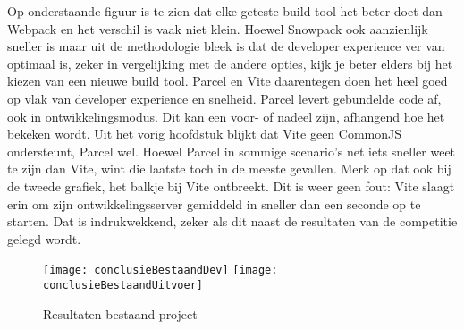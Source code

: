 Op onderstaande figuur is te zien dat elke geteste build tool het beter doet dan Webpack en het verschil is vaak niet klein. Hoewel Snowpack ook aanzienlijk sneller is maar uit de methodologie bleek is dat de developer experience ver van optimaal is, zeker in vergelijking met de andere opties, kijk je beter elders bij het kiezen van een nieuwe build tool. Parcel en Vite daarentegen doen het heel goed op vlak van developer experience en snelheid. Parcel levert gebundelde code af, ook in ontwikkelingsmodus. Dit kan een voor- of nadeel zijn, afhangend hoe het bekeken wordt. Uit het vorig hoofdstuk blijkt dat Vite geen CommonJS ondersteunt, Parcel wel. Hoewel Parcel in sommige scenario’s net iets sneller weet te zijn dan Vite, wint die laatste toch in de meeste gevallen. Merk op dat ook bij de tweede grafiek, het balkje bij Vite ontbreekt. Dit is weer geen fout: Vite slaagt erin om zijn ontwikkelingsserver gemiddeld in sneller dan een seconde op te starten. Dat is indrukwekkend, zeker als dit naast de resultaten van de competitie gelegd wordt.

\begin{figure}[h]
   \texttt{[image: conclusieBestaandDev]}
       \centering
       \texttt{[image: conclusieBestaandUitvoer]}
       \centering
       \caption{Resultaten bestaand project}
 \end{figure}
 
